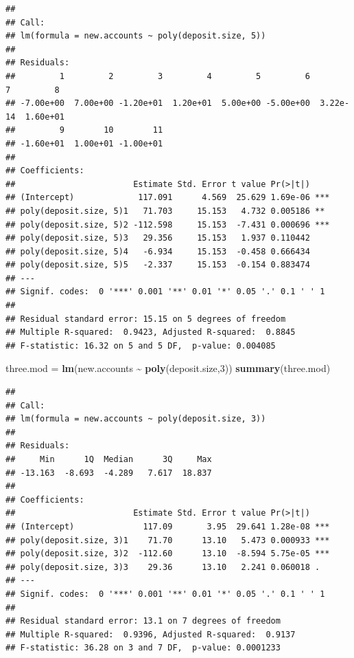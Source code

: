 \documentclass[
]{article}
\newenvironment{Shaded}{\begin{snugshade}}{\end{snugshade}}
\newcommand{\DecValTok}[1]{\textcolor[rgb]{0.00,0.00,0.81}{#1}}
\newcommand{\FunctionTok}[1]{\textcolor[rgb]{0.13,0.29,0.53}{\textbf{#1}}}
\newcommand{\NormalTok}[1]{#1}
\newcommand{\OtherTok}[1]{\textcolor[rgb]{0.56,0.35,0.01}{#1}}
\newcommand{\SpecialCharTok}[1]{\textcolor[rgb]{0.81,0.36,0.00}{\textbf{#1}}}
\begin{document}
\begin{verbatim}
## 
## Call:
## lm(formula = new.accounts ~ poly(deposit.size, 5))
## 
## Residuals:
##         1         2         3         4         5         6         7         8 
## -7.00e+00  7.00e+00 -1.20e+01  1.20e+01  5.00e+00 -5.00e+00  3.22e-14  1.60e+01 
##         9        10        11 
## -1.60e+01  1.00e+01 -1.00e+01 
## 
## Coefficients:
##                        Estimate Std. Error t value Pr(>|t|)    
## (Intercept)             117.091      4.569  25.629 1.69e-06 ***
## poly(deposit.size, 5)1   71.703     15.153   4.732 0.005186 ** 
## poly(deposit.size, 5)2 -112.598     15.153  -7.431 0.000696 ***
## poly(deposit.size, 5)3   29.356     15.153   1.937 0.110442    
## poly(deposit.size, 5)4   -6.934     15.153  -0.458 0.666434    
## poly(deposit.size, 5)5   -2.337     15.153  -0.154 0.883474    
## ---
## Signif. codes:  0 '***' 0.001 '**' 0.01 '*' 0.05 '.' 0.1 ' ' 1
## 
## Residual standard error: 15.15 on 5 degrees of freedom
## Multiple R-squared:  0.9423, Adjusted R-squared:  0.8845 
## F-statistic: 16.32 on 5 and 5 DF,  p-value: 0.004085
\end{verbatim}

\begin{Shaded}
\begin{Highlighting}[]
\NormalTok{three.mod }\OtherTok{=} \FunctionTok{lm}\NormalTok{(new.accounts }\SpecialCharTok{\textasciitilde{}} \FunctionTok{poly}\NormalTok{(deposit.size,}\DecValTok{3}\NormalTok{))}
\FunctionTok{summary}\NormalTok{(three.mod)}
\end{Highlighting}
\end{Shaded}

\begin{verbatim}
## 
## Call:
## lm(formula = new.accounts ~ poly(deposit.size, 3))
## 
## Residuals:
##     Min      1Q  Median      3Q     Max 
## -13.163  -8.693  -4.289   7.617  18.837 
## 
## Coefficients:
##                        Estimate Std. Error t value Pr(>|t|)    
## (Intercept)              117.09       3.95  29.641 1.28e-08 ***
## poly(deposit.size, 3)1    71.70      13.10   5.473 0.000933 ***
## poly(deposit.size, 3)2  -112.60      13.10  -8.594 5.75e-05 ***
## poly(deposit.size, 3)3    29.36      13.10   2.241 0.060018 .  
## ---
## Signif. codes:  0 '***' 0.001 '**' 0.01 '*' 0.05 '.' 0.1 ' ' 1
## 
## Residual standard error: 13.1 on 7 degrees of freedom
## Multiple R-squared:  0.9396, Adjusted R-squared:  0.9137 
## F-statistic: 36.28 on 3 and 7 DF,  p-value: 0.0001233
\end{verbatim}
\end{document}
